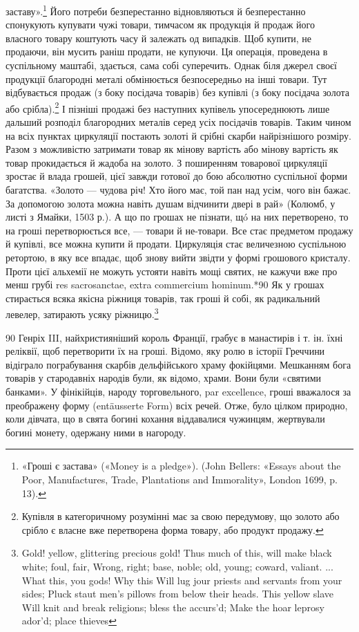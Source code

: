 \parcont{}  %
заставу».\footnote{
«Гроші є застава» («Money is a pledge»). (John Bellers: «Essays
about the Poor, Manufactures, Trade, Plantations and Immorality», London
1699, p. 13).
} Його потреби безперестанно відновляються й безперестанно
спонукують купувати чужі товари, тимчасом як продукція
й продаж його власного товару коштують часу й залежать
од випадків. Щоб купити, не продаючи, він мусить раніш продати,
не купуючи. Ця операція, проведена в суспільному маштабі,
здається, сама собі суперечить. Однак біля джерел своєї продукції
благородні металі обмінюється безпосередньо на інші товари.
Тут відбувається продаж (з боку посідача товарів) без купівлі
(з боку посідача золота або срібла).\footnote{
Купівля в категоричному розумінні має за свою передумову, що
золото або срібло є власне вже перетворена форма товару, або продукт
продажу.
} І пізніші продажі без наступних
купівель упосереднюють лише дальший розподіл благородних
металів серед усіх посідачів товарів. Таким чином на
всіх пунктах циркуляції постають золоті й срібні скарби найрізнішого
розміру. Разом з можливістю затримати товар як
мінову вартість або мінову вартість як товар прокидається й
жадоба на золото. З поширенням товарової циркуляції зростає й
влада грошей, цієї завжди готової до бою абсолютно суспільної
форми багатства. «Золото — чудова річ! Хто його має, той пан
над усім, чого він бажає. За допомогою золота можна навіть
душам відчинити двері в рай» (Колюмб, у листі з Ямайки, 1503 р.).
А що по грошах не пізнати, щó на них перетворено, то на гроші
перетворюється все, — товари й не-товари. Все стає предметом
продажу й купівлі, все можна купити й продати. Циркуляція
стає величезною суспільною ретортою, в яку все впадає, щоб
знову вийти звідти у формі грошового кристалу. Проти цієї
альхемії не можуть устояти навіть мощі святих, не кажучи вже
про менш грубі res sacrosanctae, extra commercium hominum.*90
Як у грошах стирається всяка якісна ріжниця товарів, так гроші
й собі, як радикальний левелер, затирають усяку ріжницю.\footnote{
Gold! yellow, glittering precious gold!
Thus much of this, will make black white; foul, fair,
Wrong, right; base, noble; old, young; coward, valiant.
... What this, you gods! Why this
Will lug jour priests and servants from your sides;
Pluck staut men’s pillows from below their heads.
This yellow slave
Will knit and break religions; bless the accurs'd;
Make the hoar leprosy ador’d; place thieves
}

90    Генріх III, найхристияніший король Франції, грабує в манастирів
і т. ін. їхні реліквії, щоб перетворити їх на гроші. Відомо, яку ролю
в історії Греччини відіграло пограбування скарбів дельфійського храму
фокійцями. Мешканням бога товарів у стародавніх народів були, як відомо,
храми. Вони були «святими банками». У фінікійців, народу торговельного,
par excellence, гроші вважалося за преображену форму (entäusserte
Form) всіх речей. Отже, було цілком природно, коли дівчата, що в
свята богині кохання віддавалися чужинцям, жертвували богині монету,
одержану ними в нагороду.

